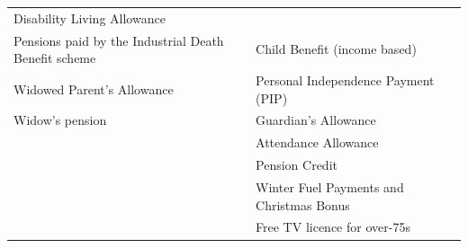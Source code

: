 \documentclass[]{tufte-handout}
\begin{document}
\begin{longtable}[]{@{}ll@{}}
\begin{minipage}[t]{0.47\columnwidth}
Disability Living Allowance\strut
\end{minipage}\tabularnewline
\begin{minipage}[t]{0.47\columnwidth}\raggedright
Pensions paid by the Industrial Death Benefit scheme\strut
\end{minipage} & \begin{minipage}[t]{0.47\columnwidth}\raggedright
Child Benefit (income based)\strut
\end{minipage}\tabularnewline
\begin{minipage}[t]{0.47\columnwidth}\raggedright
Widowed Parent's Allowance\strut
\end{minipage} & \begin{minipage}[t]{0.47\columnwidth}\raggedright
Personal Independence Payment (PIP)\strut
\end{minipage}\tabularnewline
\begin{minipage}[t]{0.47\columnwidth}\raggedright
Widow's pension\strut
\end{minipage} & \begin{minipage}[t]{0.47\columnwidth}\raggedright
Guardian's Allowance\strut
\end{minipage}\tabularnewline
\begin{minipage}[t]{0.47\columnwidth}\raggedright
\strut
\end{minipage} & \begin{minipage}[t]{0.47\columnwidth}\raggedright
Attendance Allowance\strut
\end{minipage}\tabularnewline
\begin{minipage}[t]{0.47\columnwidth}\raggedright
\strut
\end{minipage} & \begin{minipage}[t]{0.47\columnwidth}\raggedright
Pension Credit\strut
\end{minipage}\tabularnewline
\begin{minipage}[t]{0.47\columnwidth}\raggedright
\strut
\end{minipage} & \begin{minipage}[t]{0.47\columnwidth}\raggedright
Winter Fuel Payments and Christmas Bonus\strut
\end{minipage}\tabularnewline
\begin{minipage}[t]{0.47\columnwidth}\raggedright
\strut
\end{minipage} & \begin{minipage}[t]{0.47\columnwidth}\raggedright
Free TV licence for over-75s\strut
\end{minipage}\tabularnewline

\end{longtable}
\end{document}

